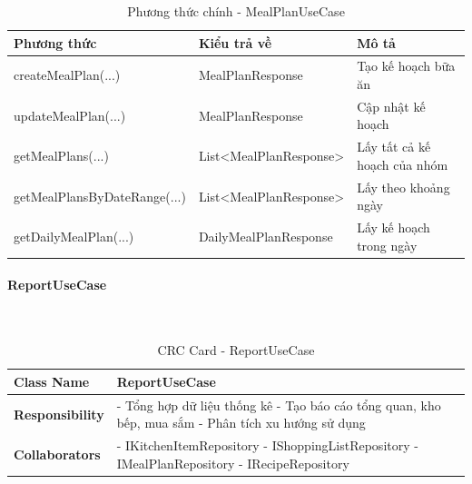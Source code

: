 \begin{table}[H]
\small
\renewcommand{\arraystretch}{1.3}
\begin{tabularx}{\textwidth}{|>{\raggedright\arraybackslash}p{5.5cm}|>{\raggedright\arraybackslash}p{3.5cm}|X|}
\hline
\rowcolor{gray!20}
\textbf{Phương thức} & \textbf{Kiểu trả về} & \textbf{Mô tả} \\
\hline
createMealPlan(...) & MealPlanResponse & Tạo kế hoạch bữa ăn \\
\hline
updateMealPlan(...) & MealPlanResponse & Cập nhật kế hoạch \\
\hline
getMealPlans(...) & List<MealPlanResponse> & Lấy tất cả kế hoạch của nhóm \\
\hline
getMealPlansByDateRange(...) & List<MealPlanResponse> & Lấy theo khoảng ngày \\
\hline
getDailyMealPlan(...) & DailyMealPlanResponse & Lấy kế hoạch trong ngày \\
\hline
\end{tabularx}
\caption{Phương thức chính - MealPlanUseCase}
\end{table}

\paragraph{ReportUseCase} ~\\

\begin{table}[H]
\small
\renewcommand{\arraystretch}{1.3}
\begin{tabularx}{\textwidth}{|>{\raggedright\arraybackslash}p{3.5cm}|X|}
\hline
\rowcolor{gray!20}
\textbf{Class Name} & ReportUseCase \\
\hline
\textbf{Responsibility} & - Tổng hợp dữ liệu thống kê \newline - Tạo báo cáo tổng quan, kho bếp, mua sắm \newline - Phân tích xu hướng sử dụng \\
\hline
\textbf{Collaborators} & - IKitchenItemRepository \newline - IShoppingListRepository \newline - IMealPlanRepository \newline - IRecipeRepository \\
\hline
\end{tabularx}
\caption{CRC Card - ReportUseCase}
\end{table}

